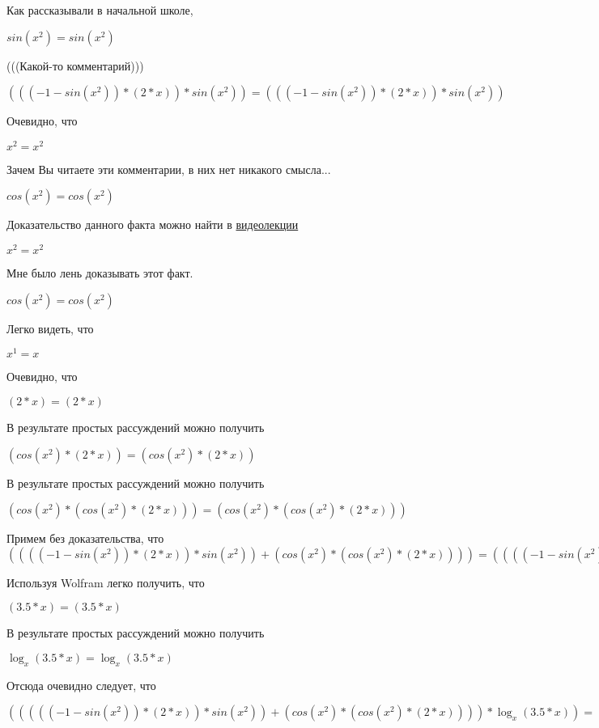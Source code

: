 \documentclass[12pt,a4paper,fleqn]{article}
\theoremstyle{definition}
\begin{document}
Как рассказывали в начальной школе,

$sin({ x }^{ 2 }) = sin({ x }^{ 2 })$

(((Какой-то комментарий)))

$((( -1  - sin({ x }^{ 2 })) * ( 2  *  x )) * sin({ x }^{ 2 })) = ((( -1  - sin({ x }^{ 2 })) * ( 2  *  x )) * sin({ x }^{ 2 }))$

Очевидно, что

${ x }^{ 2 } = { x }^{ 2 }$

Зачем Вы читаете эти комментарии, в них нет никакого смысла...

$cos({ x }^{ 2 }) = cos({ x }^{ 2 })$

Доказательство данного факта можно найти в \href{https://www.youtube.com/watch?v=dQw4w9WgXcQ}{видеолекции}

${ x }^{ 2 } = { x }^{ 2 }$

Мне было лень доказывать этот факт.

$cos({ x }^{ 2 }) = cos({ x }^{ 2 })$

Легко видеть, что

${ x }^{ 1 } =  x $

Очевидно, что

$( 2  *  x ) = ( 2  *  x )$

В результате простых рассуждений можно получить

$(cos({ x }^{ 2 }) * ( 2  *  x )) = (cos({ x }^{ 2 }) * ( 2  *  x ))$

В результате простых рассуждений можно получить

$(cos({ x }^{ 2 }) * (cos({ x }^{ 2 }) * ( 2  *  x ))) = (cos({ x }^{ 2 }) * (cos({ x }^{ 2 }) * ( 2  *  x )))$

Примем без доказательства, что
$(((( -1  - sin({ x }^{ 2 })) * ( 2  *  x )) * sin({ x }^{ 2 })) + (cos({ x }^{ 2 }) * (cos({ x }^{ 2 }) * ( 2  *  x )))) = (((( -1  - sin({ x }^{ 2 })) * ( 2  *  x )) * sin({ x }^{ 2 })) + (cos({ x }^{ 2 }) * (cos({ x }^{ 2 }) * ( 2  *  x ))))$

Используя Wolfram легко получить, что

$( 3.5  *  x ) = ( 3.5  *  x )$

В результате простых рассуждений можно получить

$\log_{ x }{( 3.5  *  x )} = \log_{ x }{( 3.5  *  x )}$

Отсюда очевидно следует, что

$((((( -1  - sin({ x }^{ 2 })) * ( 2  *  x )) * sin({ x }^{ 2 })) + (cos({ x }^{ 2 }) * (cos({ x }^{ 2 }) * ( 2  *  x )))) * \log_{ x }{( 3.5  *  x )}) = ((((( -1  - sin({ x }^{ 2 })) * ( 2  *  x )) * sin({ x }^{ 2 })) + (cos({ x }^{ 2 }) * (cos({ x }^{ 2 }) * ( 2  *  x )))) * \log_{ x }{( 3.5  *  x )})$
\end{document}

